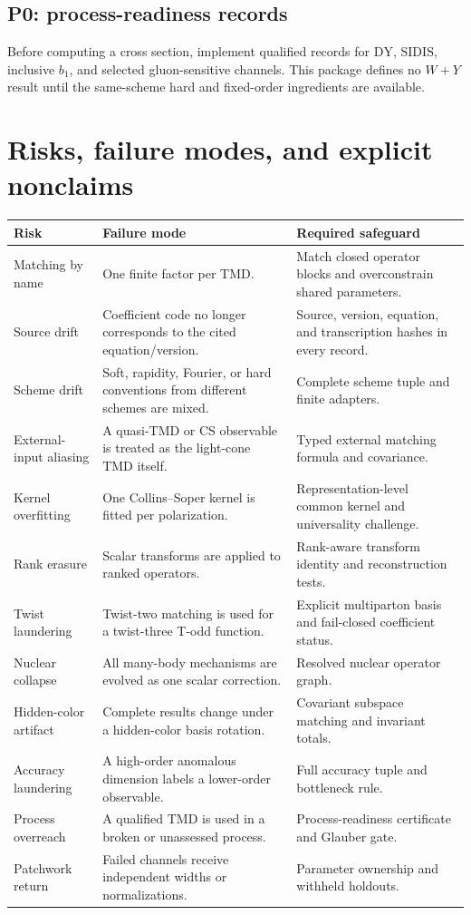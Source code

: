 \documentclass[11pt]{article}
\newcommand{\DY}{\mathrm{DY}}
\newcommand{\SIDIS}{\mathrm{SIDIS}}
\begin{document}
\subsection{P0: process-readiness records}

Before computing a cross section, implement qualified records for \(\DY\), \(\SIDIS\), inclusive \(b_1\), and selected gluon-sensitive channels.  This package defines no \(W+Y\) result until the same-scheme hard and fixed-order ingredients are available.

\section{Risks, failure modes, and explicit nonclaims}
\label{sec:risks}

\begin{longtable}{L{0.21\textwidth}L{0.31\textwidth}L{0.40\textwidth}}
\toprule
Risk & Failure mode & Required safeguard\\
\midrule
\endhead
Matching by name & One finite factor per TMD. & Match closed operator blocks and overconstrain shared parameters.\\
Source drift & Coefficient code no longer corresponds to the cited equation/version. & Source, version, equation, and transcription hashes in every record.\\
Scheme drift & Soft, rapidity, Fourier, or hard conventions from different schemes are mixed. & Complete scheme tuple and finite adapters.\\
External-input aliasing & A quasi-TMD or CS observable is treated as the light-cone TMD itself. & Typed external matching formula and covariance.\\
Kernel overfitting & One Collins--Soper kernel is fitted per polarization. & Representation-level common kernel and universality challenge.\\
Rank erasure & Scalar transforms are applied to ranked operators. & Rank-aware transform identity and reconstruction tests.\\
Twist laundering & Twist-two matching is used for a twist-three T-odd function. & Explicit multiparton basis and fail-closed coefficient status.\\
Nuclear collapse & All many-body mechanisms are evolved as one scalar correction. & Resolved nuclear operator graph.\\
Hidden-color artifact & Complete results change under a hidden-color basis rotation. & Covariant subspace matching and invariant totals.\\
Accuracy laundering & A high-order anomalous dimension labels a lower-order observable. & Full accuracy tuple and bottleneck rule.\\
Process overreach & A qualified TMD is used in a broken or unassessed process. & Process-readiness certificate and Glauber gate.\\
Patchwork return & Failed channels receive independent widths or normalizations. & Parameter ownership and withheld holdouts.\\
\bottomrule
\end{longtable}
\end{document}
